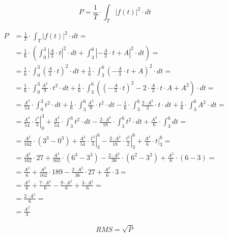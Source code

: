 \begin{task}
\begin{equation}
P=\frac{1}{T} \cdot \int_{T}^{}\left|f(t)\right|^2 \cdot dt
\end{equation}

\begin{align*}
P&=\frac{1}{T} \cdot \int_{T}^{}\left|f(t)\right|^2 \cdot dt=\\
 &=\frac{1}{6} \cdot \left( \int_{0}^{3}\left|\frac{A}{3}\cdot t \right|^2 \cdot dt
  +\int_{3}^{6}\left|-\frac{A}{3}\cdot t + A\right|^2 \cdot dt \right)=\\ 
 &=\frac{1}{6} \cdot \int_{0}^{3}\left(\frac{A}{3}\cdot t \right)^2 \cdot dt
  +\frac{1}{6} \cdot \int_{3}^{6}\left(-\frac{A}{3}\cdot t + A\right)^2 \cdot dt=\\ 
 &=\frac{1}{6} \cdot \int_{0}^{3}\frac{A^2}{9}\cdot t^2 \cdot dt
 +\frac{1}{6} \cdot \int_{3}^{6}\left(\left(-\frac{A}{3}\cdot t\right)^2 - 2\cdot \frac{A}{3}\cdot t \cdot  A + A^2 \right) \cdot dt=\\ 
 &=\frac{A^2}{54}\cdot \int_{0}^{3} t^2 \cdot dt
 +\frac{1}{6} \cdot \int_{3}^{6}\frac{A^2}{9}\cdot t^2 \cdot dt - \frac{1}{6} \cdot \int_{3}^{6} \frac{2 \cdot A^2}{3}\cdot t \cdot dt + \frac{1}{6} \cdot \int_{3}^{6} A^2 \cdot dt=\\
 &=\frac{A^2}{54}\cdot \left. \frac{t^3}{3} \right|_{0}^{3}
 +\frac{A^2}{54}\cdot \int_{3}^{6} t^2 \cdot dt - \frac{2 \cdot A^2}{18}\cdot \int_{3}^{6} t^2 \cdot dt +\frac{A^2}{6}\cdot \int_{3}^{6} dt=\\
 &=\frac{A^2}{162}\cdot \left(3^3 - 0^3\right) + \frac{A^2}{54}\cdot \left. \frac{t^3}{3} \right|_{3}^{6} - \frac{2 \cdot A^2}{18}\cdot \left. \frac{t^2}{2} \right|_{3}^{6} + \frac{A^2}{6}\cdot \left. t \right|_{3}^{6}=\\
 &=\frac{A^2}{162}\cdot 27 + \frac{A^2}{162}\cdot \left(6^3 - 3^3\right) - \frac{2 \cdot A^2}{36}\cdot \left(6^2 - 3^2\right) + \frac{A^2}{6}\cdot (6-3)=\\
 &=\frac{A^2}{6} + \frac{A^2}{162}\cdot 189 - \frac{2 \cdot A^2}{36}\cdot 27 + \frac{A^2}{6}\cdot 3=\\
 &=\frac{A^2}{6} + \frac{7 \cdot A^2}{6} - \frac{9 \cdot A^2}{6} + \frac{3 \cdot A^2}{6}=\\
 &=\frac{2 \cdot A^2}{6}=\\
 &=\frac{A^2}{3}
\end{align*}


\begin{equation}
RMS=\sqrt P
\end{equation}

\end{task}